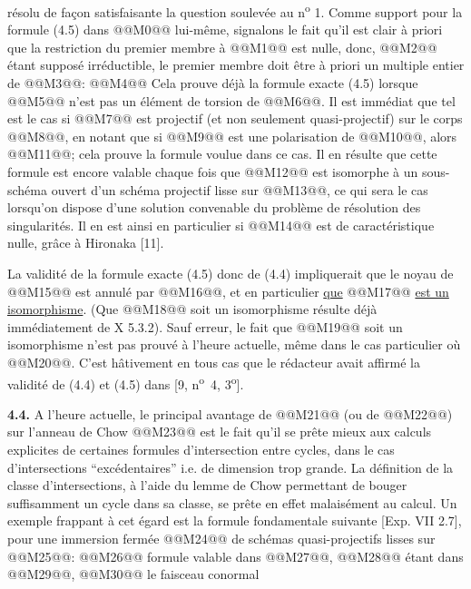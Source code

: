 
résolu de
façon satisfaisante la question soulevée au n\textsuperscript{o} 1. Comme support pour la formule (4.5) dans @@M0@@ lui-même, signalons le fait qu'il est clair à priori que la restriction du premier membre à @@M1@@ est nulle, donc, @@M2@@ étant supposé irréductible, le premier membre doit être à priori un multiple entier de @@M3@@:
@@M4@@
Cela prouve déjà la formule exacte (4.5) lorsque @@M5@@ n'est pas un élément de torsion de @@M6@@. Il est immédiat que tel est le cas si @@M7@@ est projectif (et non seulement quasi-projectif) sur le corps @@M8@@, en notant que si @@M9@@ est une polarisation de @@M10@@, alors @@M11@@; cela prouve la formule voulue dans ce cas. Il en résulte que cette formule est encore valable chaque fois que @@M12@@ est isomorphe à un sous-schéma ouvert d'un schéma projectif lisse sur @@M13@@, ce qui sera le cas lorsqu'on dispose d'une solution convenable du problème de résolution des singularités. Il en est ainsi en particulier si @@M14@@ est de caractéristique nulle, grâce à Hironaka [11].

La validité de la formule exacte (4.5) donc de (4.4) impliquerait que le noyau de @@M15@@ est annulé par @@M16@@, et en particulier \uline{que} @@M17@@ \uline{est un isomorphisme}. (Que @@M18@@ soit un isomorphisme résulte déjà immédiatement de X 5.3.2). Sauf erreur, le fait que @@M19@@ soit un isomorphisme n'est pas prouvé à l'heure actuelle, même dans le cas particulier où @@M20@@. C'est hâtivement en tous cas que le rédacteur avait affirmé la validité de (4.4) et (4.5) dans [9, n\textsuperscript{o}~4, 3\textsuperscript{o}].

\textbf{4.4.} A l'heure actuelle, le principal avantage de @@M21@@ (ou de @@M22@@) sur l'anneau de Chow @@M23@@ est le fait qu'il se prête mieux aux calculs explicites de certaines formules d'intersection entre cycles, dans le cas d'intersections ``excédentaires'' i.e. de dimension trop grande. La définition de la classe d'intersections, à l'aide du lemme de Chow permettant de bouger suffisamment un cycle dans sa classe, se prête en effet malaisément au calcul. Un exemple frappant à cet égard est la formule fondamentale suivante [Exp. VII 2.7], pour une immersion fermée @@M24@@ de schémas quasi-projectifs lisses sur @@M25@@:
@@M26@@
formule valable dans @@M27@@, @@M28@@ étant dans @@M29@@, @@M30@@ le faisceau conormal 
